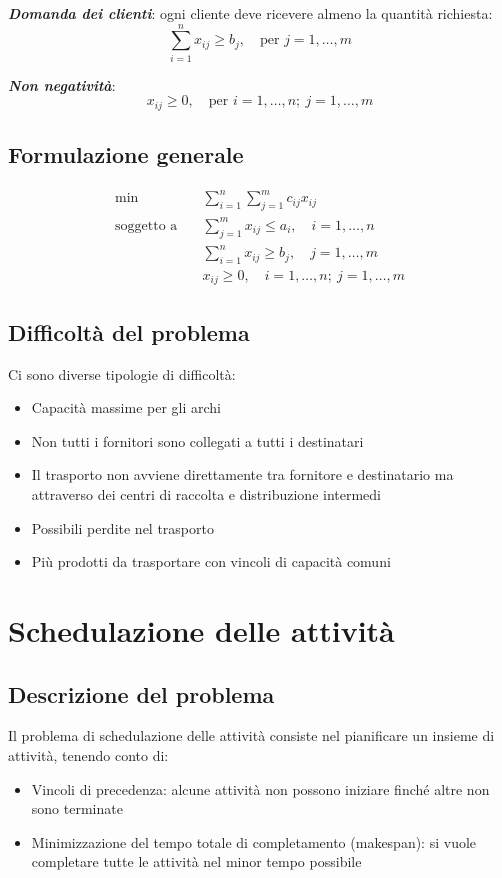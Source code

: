 \textbf{\textit{Domanda dei clienti}}: ogni cliente deve ricevere almeno la quantità richiesta:
\[
\sum_{i=1}^{n} x_{ij} \geq b_j, \quad \text{per } j = 1, \dots, m
\]

\textbf{\textit{Non negatività}}:
\[
x_{ij} \geq 0, \quad \text{per } i = 1, \dots, n;\ j = 1, \dots, m
\]

\subsection{Formulazione generale}
\[
\begin{aligned}
\min \quad & \sum_{i=1}^{n} \sum_{j=1}^{m} c_{ij} x_{ij} \\
\text{soggetto a} \quad 
& \sum_{j=1}^{m} x_{ij} \leq a_i, \quad i = 1, \dots, n \\
& \sum_{i=1}^{n} x_{ij} \geq b_j, \quad j = 1, \dots, m \\
& x_{ij} \geq 0, \quad i = 1, \dots, n;\ j = 1, \dots, m
\end{aligned}
\]

\subsection{Difficoltà del problema}
Ci sono diverse tipologie di difficoltà:
\begin{itemize}
    \item Capacità massime per gli archi
    \item Non tutti i fornitori sono collegati a tutti i destinatari
    \item Il trasporto non avviene direttamente tra fornitore e destinatario ma attraverso dei centri di raccolta e distribuzione intermedi
    \item Possibili perdite nel trasporto
    \item Più prodotti da trasportare con vincoli di capacità comuni
\end{itemize}

\section{Schedulazione delle attività}
\subsection{Descrizione del problema}

Il problema di schedulazione delle attività consiste nel pianificare un insieme di attività,
tenendo conto di:
\begin{itemize}
    \item Vincoli di precedenza: alcune attività non possono iniziare finché altre non sono terminate
    \item Minimizzazione del tempo totale di completamento (makespan): si vuole completare tutte le attività nel minor tempo possibile
\end{itemize}

